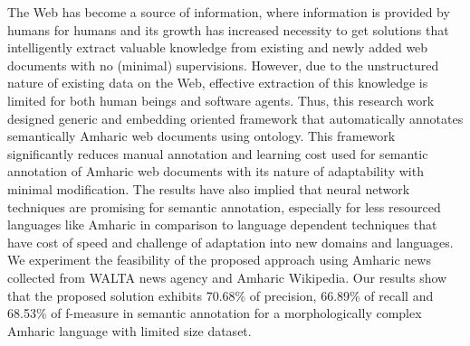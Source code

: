 The Web has become a source of information, where information is provided by humans for humans and its growth has increased necessity to get solutions that intelligently extract valuable knowledge from existing and newly added web documents with no (minimal) supervisions. However, due to the unstructured nature of existing data on the Web, effective extraction of this knowledge is limited for both human beings and software agents. Thus, this research work designed generic and embedding oriented framework that automatically annotates semantically Amharic web documents using ontology. This framework significantly reduces manual annotation and learning cost used for semantic annotation of Amharic web documents with its nature of adaptability with minimal modification. The results have also implied that neural network techniques are promising for semantic annotation, especially for less resourced languages like Amharic in comparison to language dependent techniques that have cost of speed and challenge of adaptation into new domains and languages. We experiment the feasibility of the proposed approach using Amharic news collected from WALTA news agency and Amharic Wikipedia. Our results show that the proposed solution exhibits 70.68\% of precision, 66.89\% of recall and 68.53\% of f-measure in semantic annotation for a morphologically complex Amharic language with limited size dataset.
